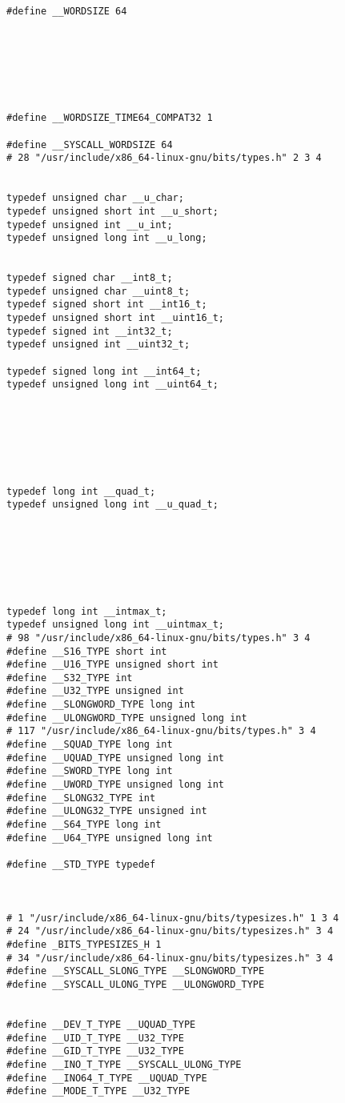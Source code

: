 \documentclass[11pt]{article}
\begin{document}
\begin{verbatim}
#define __WORDSIZE 64







#define __WORDSIZE_TIME64_COMPAT32 1

#define __SYSCALL_WORDSIZE 64
# 28 "/usr/include/x86_64-linux-gnu/bits/types.h" 2 3 4


typedef unsigned char __u_char;
typedef unsigned short int __u_short;
typedef unsigned int __u_int;
typedef unsigned long int __u_long;


typedef signed char __int8_t;
typedef unsigned char __uint8_t;
typedef signed short int __int16_t;
typedef unsigned short int __uint16_t;
typedef signed int __int32_t;
typedef unsigned int __uint32_t;

typedef signed long int __int64_t;
typedef unsigned long int __uint64_t;







typedef long int __quad_t;
typedef unsigned long int __u_quad_t;







typedef long int __intmax_t;
typedef unsigned long int __uintmax_t;
# 98 "/usr/include/x86_64-linux-gnu/bits/types.h" 3 4
#define __S16_TYPE short int
#define __U16_TYPE unsigned short int
#define __S32_TYPE int
#define __U32_TYPE unsigned int
#define __SLONGWORD_TYPE long int
#define __ULONGWORD_TYPE unsigned long int
# 117 "/usr/include/x86_64-linux-gnu/bits/types.h" 3 4
#define __SQUAD_TYPE long int
#define __UQUAD_TYPE unsigned long int
#define __SWORD_TYPE long int
#define __UWORD_TYPE unsigned long int
#define __SLONG32_TYPE int
#define __ULONG32_TYPE unsigned int
#define __S64_TYPE long int
#define __U64_TYPE unsigned long int

#define __STD_TYPE typedef



# 1 "/usr/include/x86_64-linux-gnu/bits/typesizes.h" 1 3 4
# 24 "/usr/include/x86_64-linux-gnu/bits/typesizes.h" 3 4
#define _BITS_TYPESIZES_H 1
# 34 "/usr/include/x86_64-linux-gnu/bits/typesizes.h" 3 4
#define __SYSCALL_SLONG_TYPE __SLONGWORD_TYPE
#define __SYSCALL_ULONG_TYPE __ULONGWORD_TYPE


#define __DEV_T_TYPE __UQUAD_TYPE
#define __UID_T_TYPE __U32_TYPE
#define __GID_T_TYPE __U32_TYPE
#define __INO_T_TYPE __SYSCALL_ULONG_TYPE
#define __INO64_T_TYPE __UQUAD_TYPE
#define __MODE_T_TYPE __U32_TYPE


\end{verbatim}
\end{document}
